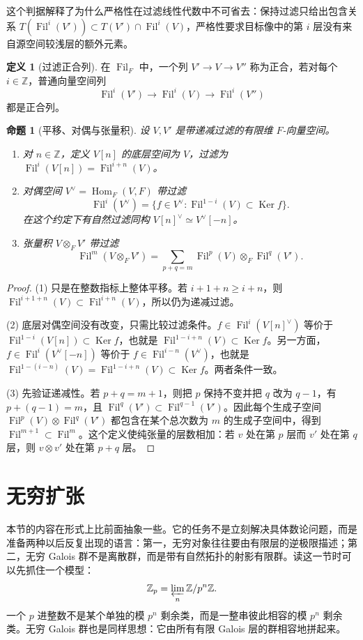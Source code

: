 \documentclass[11pt,a4paper,openany]{ctexbook}
\numberwithin{equation}{chapter}
\newcommand{\Z}{\mathbb{Z}}
\newcommand{\Hom}{\operatorname{Hom}}
\newcommand{\Ker}{\operatorname{Ker}}
\newcommand{\Fil}{\operatorname{Fil}}
\theoremstyle{plain}
\newtheorem{proposition}[theorem]{命题}
\theoremstyle{definition}
\newtheorem{definition}[theorem]{定义}
\theoremstyle{remark}
\begin{document}
这个判据解释了为什么严格性在过滤线性代数中不可省去：保持过滤只给出包含关系 $T(\Fil^i(V'))\subset T(V')\cap\Fil^i(V)$，严格性要求目标像中的第 $i$ 层没有来自源空间较浅层的额外元素。

\begin{definition}[过滤正合列]
在 $\operatorname{Fil}_F$ 中，一个列 $V'\to V\to V''$ 称为正合，若对每个 $i\in\Z$，普通向量空间列
\[
\Fil^i(V')\longrightarrow \Fil^i(V)\longrightarrow \Fil^i(V'')
\]
都是正合列。
\end{definition}

\begin{proposition}[平移、对偶与张量积]
设 $V,V'$ 是带递减过滤的有限维 $F$-向量空间。
\begin{enumerate}[label=(\arabic*)]
\item 对 $n\in\Z$，定义 $V[n]$ 的底层空间为 $V$，过滤为 $\Fil^i(V[n])=\Fil^{i+n}(V)$。
\item 对偶空间 $V^\vee=\Hom_F(V,F)$ 带过滤
\[
\Fil^i(V^\vee)=\{f\in V^\vee:\Fil^{1-i}(V)\subset\Ker f\}.
\]
在这个约定下有自然过滤同构 $V[n]^\vee\simeq V^\vee[-n]$。
\item 张量积 $V\otimes_FV'$ 带过滤
\[
\Fil^m(V\otimes_FV')
=\sum_{p+q=m}\Fil^p(V)\otimes_F\Fil^q(V').
\]
\end{enumerate}
\end{proposition}

\begin{proof}
(1) 只是在整数指标上整体平移。若 $i+1+n\ge i+n$，则 $\Fil^{i+1+n}(V)\subset\Fil^{i+n}(V)$，所以仍为递减过滤。

(2) 底层对偶空间没有改变，只需比较过滤条件。$f\in\Fil^i(V[n]^\vee)$ 等价于 $\Fil^{1-i}(V[n])\subset\Ker f$，也就是 $\Fil^{1-i+n}(V)\subset\Ker f$。另一方面，$f\in\Fil^i(V^\vee[-n])$ 等价于 $f\in\Fil^{i-n}(V^\vee)$，也就是 $\Fil^{1-(i-n)}(V)=\Fil^{1-i+n}(V)\subset\Ker f$。两者条件一致。

(3) 先验证递减性。若 $p+q=m+1$，则把 $p$ 保持不变并把 $q$ 改为 $q-1$，有 $p+(q-1)=m$，且 $\Fil^q(V')\subset\Fil^{q-1}(V')$。因此每个生成子空间 $\Fil^p(V)\otimes\Fil^q(V')$ 都包含在某个总次数为 $m$ 的生成子空间中，得到 $\Fil^{m+1}\subset\Fil^m$。这个定义使纯张量的层数相加：若 $v$ 处在第 $p$ 层而 $v'$ 处在第 $q$ 层，则 $v\otimes v'$ 处在第 $p+q$ 层。
\end{proof}

\section{无穷扩张}
本节的内容在形式上比前面抽象一些。它的任务不是立刻解决具体数论问题，而是准备两种以后反复出现的语言：第一，无穷对象往往要由有限层的逆极限描述；第二，无穷 Galois 群不是离散群，而是带有自然拓扑的射影有限群。读这一节时可以先抓住一个模型：
\[
\Z_p=\varprojlim_n \Z/p^n\Z.
\]
一个 $p$ 进整数不是某个单独的模 $p^n$ 剩余类，而是一整串彼此相容的模 $p^n$ 剩余类。无穷 Galois 群也是同样思想：它由所有有限 Galois 层的群相容地拼起来。
\end{document}
